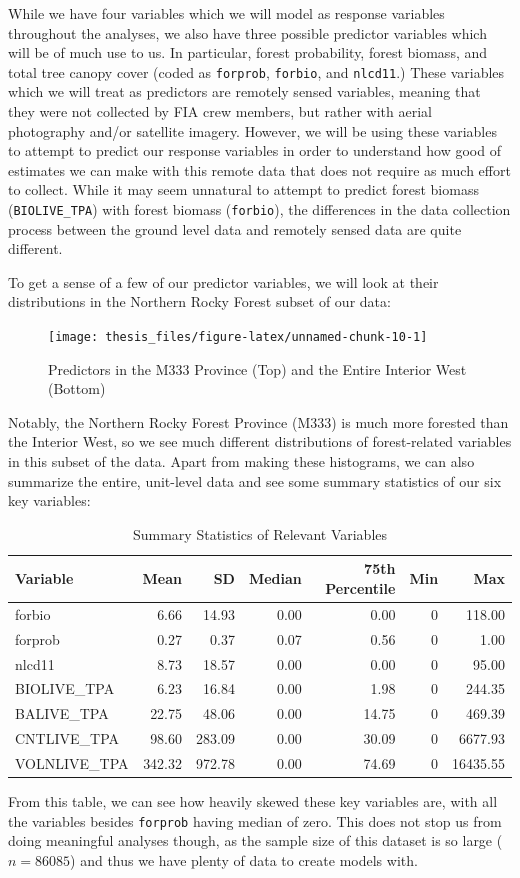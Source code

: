 \documentclass[12pt,twoside]{reedthesis}
\begin{document}
While we have four variables which we will model as response variables throughout the analyses, we also have three possible predictor variables which will be of much use to us. In particular, forest probability, forest biomass, and total tree canopy cover (coded as \texttt{forprob}, \texttt{forbio}, and \texttt{nlcd11}.) These variables which we will treat as predictors are remotely sensed variables, meaning that they were not collected by FIA crew members, but rather with aerial photography and/or satellite imagery. However, we will be using these variables to attempt to predict our response variables in order to understand how good of estimates we can make with this remote data that does not require as much effort to collect. While it may seem unnatural to attempt to predict forest biomass (\texttt{BIOLIVE\_TPA}) with forest biomass (\texttt{forbio}), the differences in the data collection process between the ground level data and remotely sensed data are quite different.

To get a sense of a few of our predictor variables, we will look at their distributions in the Northern Rocky Forest subset of our data:
\begin{figure}

{\centering \texttt{[image: thesis\_files/figure-latex/unnamed-chunk-10-1]} 

}

\caption{Predictors in the M333 Province (Top) and the Entire Interior West (Bottom)}\label{fig:unnamed-chunk-10}
\end{figure}
Notably, the Northern Rocky Forest Province (M333) is much more forested than the Interior West, so we see much different distributions of forest-related variables in this subset of the data. Apart from making these histograms, we can also summarize the entire, unit-level data and see some summary statistics of our six key variables:
\begin{longtable}[t]{lrrrrrr}
\caption[Summary Statistics of Relevant Variables]{\label{tab:unnamed-chunk-11}Summary Statistics of Relevant Variables}\\
\toprule
Variable & Mean & SD & Median & 75th Percentile & Min & Max\\
\midrule
forbio & 6.66 & 14.93 & 0.00 & 0.00 & 0 & 118.00\\
forprob & 0.27 & 0.37 & 0.07 & 0.56 & 0 & 1.00\\
nlcd11 & 8.73 & 18.57 & 0.00 & 0.00 & 0 & 95.00\\
BIOLIVE\_TPA & 6.23 & 16.84 & 0.00 & 1.98 & 0 & 244.35\\
BALIVE\_TPA & 22.75 & 48.06 & 0.00 & 14.75 & 0 & 469.39\\
\addlinespace
CNTLIVE\_TPA & 98.60 & 283.09 & 0.00 & 30.09 & 0 & 6677.93\\
VOLNLIVE\_TPA & 342.32 & 972.78 & 0.00 & 74.69 & 0 & 16435.55\\
\bottomrule
\end{longtable}
From this table, we can see how heavily skewed these key variables are, with all the variables besides \texttt{forprob} having median of zero. This does not stop us from doing meaningful analyses though, as the sample size of this dataset is so large (\(n = 86085\)) and thus we have plenty of data to create models with.
\end{document}

